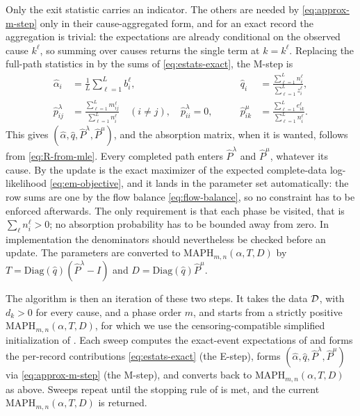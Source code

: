 \documentclass{article}
\newenvironment{rcrevision}{}{}
\newcommand{\aachg}[1]{#1}
\newcommand{\subchg}[1]{#1}
\begin{document}
\begin{rcrevision}
\subchg{Only the exit statistic carries an indicator. The others are needed by \eqref{eq:approx-m-step} only in their cause-aggregated form, and for an exact record the aggregation is trivial: the expectations are already conditional on the observed cause $k^\ell$, so summing over causes returns the single term at $k=k^\ell$.} Replacing the full-path statistics in  by the sums of \aachg{\eqref{eq:estats-exact}}, the M-step is
\end{rcrevision}
\begin{equation}
\label{eq:approx-m-step}
\begin{aligned}
\hat\alpha_i &= \frac1L\sum_{\ell=1}^L b_i^\ell, &\qquad
\hat q_i &= \frac{\sum_{\ell=1}^L n_i^\ell}{\sum_{\ell=1}^L z_i^\ell}, \\[4pt]
\hat p^\lambda_{ij} &= \frac{\sum_{\ell=1}^L m_{ij}^\ell}{\sum_{\ell=1}^L n_{i}^\ell}\quad(i\neq j),\quad \hat p^\lambda_{ii}=0,
&\qquad
\hat p^\mu_{ik} &= \frac{\sum_{\ell=1}^L e_{ik}^\ell}{\sum_{\ell=1}^L n_{i}^\ell}.
\end{aligned}
\end{equation}
\begin{rcrevision}
\subchg{This gives $(\hat\alpha,\hat q,\widehat P^\lambda,\widehat P^\mu)$, and the absorption matrix, when it is wanted, follows from \eqref{eq:R-from-mle}. Every completed path enters $\widehat P^\lambda$ and $\widehat P^\mu$, whatever its cause. By \Cref{prop:approx-mle} the update is the exact maximizer of the expected complete-data log-likelihood \eqref{eq:em-objective}, and it lands in the parameter set automatically: the row sums are one by the flow balance \eqref{eq:flow-balance}, so no constraint has to be enforced afterwards. The only requirement is that each phase be visited, that is $\sum_\ell n^\ell_i>0$; no absorption probability has to be bounded away from zero. In implementation the denominators should nevertheless be checked before an update. The parameters are converted to $\text{MAPH}_{m,n}(\alpha,T,D)$ by $T=\mathrm{Diag}(\hat q)(\widehat P^\lambda - I)$ and $D=\mathrm{Diag}(\hat q)\widehat P^\mu$.}
\end{rcrevision}

\begin{rcrevision}
The algorithm is then an iteration of these two steps. It takes the data ${\cal D}$, with
$d_k>0$ for every cause, and a phase order $m$, and starts from a strictly positive
$\text{MAPH}_{m,n}(\alpha,T,D)$, for which we use the censoring-compatible simplified
initialization of . Each sweep computes the exact-event expectations of
 and forms the per-record contributions \eqref{eq:estats-exact} (the E-step),
forms $(\hat\alpha,\hat q,\widehat P^\lambda,\widehat P^\mu)$ via \eqref{eq:approx-m-step}
(the M-step), and converts back to $\text{MAPH}_{m,n}(\alpha,T,D)$ as above. Sweeps repeat until
the stopping rule of  is met, and the current
$\text{MAPH}_{m,n}(\alpha,T,D)$ is returned.
\end{rcrevision}
\end{document}
